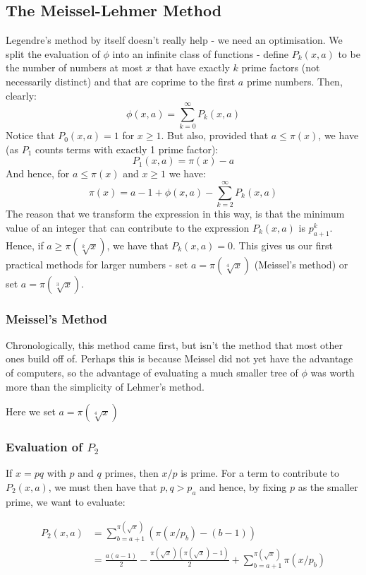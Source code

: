 \documentclass[12pt]{article}
\begin{document}
\subsection{The Meissel-Lehmer Method}
Legendre's method by itself doesn't really help - we need an optimisation. We split the evaluation of $\phi$ into an
infinite class of functions - define $P_k(x, a)$ to be the number of numbers at most $x$ that have exactly $k$ prime
factors (not necessarily distinct) and that are coprime to the first $a$ prime numbers. Then, clearly:
$$\phi(x,a) = \sum_{k=0}^{\infty}P_k(x,a)$$
Notice that $P_0(x,a)=1$ for $x\geq1$.
But also, provided that $a\leq\pi(x)$, we have (as $P_1$ counts terms with exactly 1 prime factor):
$$P_1(x,a)=\pi(x) - a$$
And hence, for $a\leq\pi(x)$ and $x\geq1$ we have:
$$\pi(x) = a - 1 + \phi(x,a) - \sum_{k=2}^{\infty}P_k(x,a)$$
The reason that we transform the expression in this way, is that the minimum value of an integer that can
contribute to the expression $P_k(x,a)$ is $p_{a+1}^k$. Hence, if $a\geq\pi\left(\sqrt[k]{x}\right)$, we have
that $P_k(x,a) = 0$. This gives us our first practical methods for larger numbers - set $a=\pi\left(\sqrt[4]{x}\right)$
(Meissel's method) or set $a=\pi\left(\sqrt[3]{x}\right)$.

\subsubsection{Meissel's Method}
Chronologically, this method came first, but isn't the method that most other ones build off of. Perhaps this
is because Meissel did not yet have the advantage of computers, so the advantage of evaluating a much smaller
tree of $\phi$ was worth more than the simplicity of Lehmer's method.

Here we set $a=\pi\left(\sqrt[4]{x}\right)$

\subsubsection*{Evaluation of $P_2$}
If $x=pq$ with $p$ and $q$ primes, then $x/p$ is prime. For a term to contribute to $P_2(x,a)$, we must then
have that $p,q>p_a$ and hence, by fixing $p$ as the smaller prime, we want to evaluate:

\begin{align*}
  P_2(x,a)
    &=\sum_{b=a+1}^{\pi(\sqrt{x})}\left(\pi\left(x/p_b\right) - (b - 1)\right)\\
    &=\frac{a(a-1)}{2}-\frac{\pi\left(\sqrt{x}\right)(\pi\left(\sqrt{x}\right)-1)}{2}
      +\sum_{b=a+1}^{\pi(\sqrt{x})}\pi\left(x/p_b\right)
  \end{align*}
\end{document}
